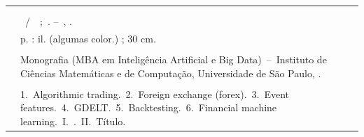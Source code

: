 \begin{fichacatalografica}
	\hspace{-1.4cm}
	\imprimirnotaautorizacao \\ \\
	\vspace*{\fill}
\begin{center}
  \imprimirnotabib \\
  \begin{table}[htb]
	\scriptsize
	\centering
	\begin{tabular}{|p{0.9cm} p{8.7cm}|}
		\hline
		& \\
		& \imprimirautorficha \\
		\imprimircutter &
			\hspace{0.4cm}\imprimirtitulo~/~\imprimirautor~;~\imprimirorientadorcorpoficha. --~\imprimirlocal, \imprimirdata. \\
		& \hspace{0.4cm}\pageref{LastPage} p. : il. (algumas color.) ; 30 cm.\\
		& \\
		& \hspace{0.4cm}Monografia (MBA em Intelig\^encia Artificial e Big Data)~--~Instituto de Ci\^encias Matem\'aticas e de Computa\c{c}\~ao, Universidade de S\~ao Paulo, \imprimirdata. \\
		& \\
		& \hspace{0.4cm}1.~Algorithmic trading.~2.~Foreign exchange (forex).~3.~Event features.~4.~GDELT.~5.~Backtesting.~6.~Financial machine learning.~I.~\imprimirorientadorficha.~II.~T\'itulo. \\
		\hline
	\end{tabular}
  \end{table}
\end{center}
\end{fichacatalografica}
